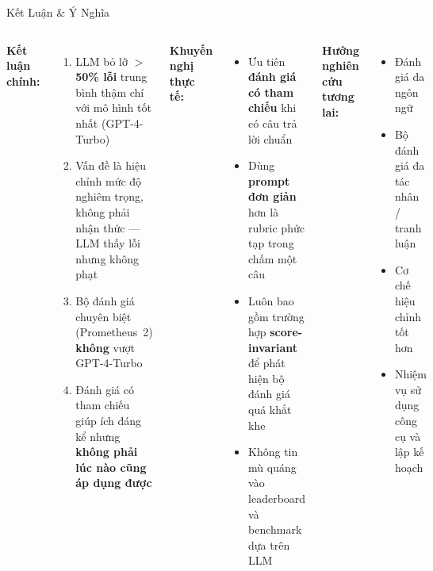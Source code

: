 \documentclass[aspectratio=169,10pt]{beamer}
\newcommand{\good}[1]{\textcolor{green!60!black}{\textbf{#1}}}
\newcommand{\bad}[1]{\textcolor{aclred}{\textbf{#1}}}
\begin{document}
\begin{frame}{Kết Luận \& Ý Nghĩa}
  \begin{columns}[T]
      \textbf{Kết luận chính:}
      \begin{enumerate}
      \setlength{\itemsep}{0.2em}
        \item LLM bỏ lỡ \bad{$>$50\% lỗi} trung bình thậm chí với mô hình tốt nhất (GPT-4-Turbo)
        \item Vấn đề là \alert{hiệu chỉnh mức độ nghiêm trọng}, không phải nhận thức — LLM thấy lỗi nhưng không phạt
        \item Bộ đánh giá chuyên biệt (Prometheus~2) \bad{không} vượt GPT-4-Turbo
        \item Đánh giá có tham chiếu giúp ích đáng kể nhưng \bad{không phải lúc nào cũng áp dụng được}
      \end{enumerate}

      \textbf{Khuyến nghị thực tế:}
      \begin{itemize}
      \setlength{\itemsep}{0.15em}
        \item[\checkmark] Ưu tiên \good{đánh giá có tham chiếu} khi có câu trả lời chuẩn
        \item[\checkmark] Dùng \good{prompt đơn giản} hơn là rubric phức tạp trong chấm một câu
        \item[\checkmark] Luôn bao gồm trường hợp \good{score-invariant} để phát hiện bộ đánh giá quá khắt khe
        \item[$\times$] Không tin mù quáng vào leaderboard và benchmark dựa trên LLM
      \end{itemize}

      \vspace{0.4em}
      \textbf{Hướng nghiên cứu tương lai:}
      \begin{itemize}
      \setlength{\itemsep}{0.15em}
        \item Đánh giá đa ngôn ngữ
        \item Bộ đánh giá đa tác nhân / tranh luận
        \item Cơ chế hiệu chỉnh tốt hơn
        \item Nhiệm vụ sử dụng công cụ và lập kế hoạch
      \end{itemize}
  \end{columns}
\end{frame}
\end{document}
